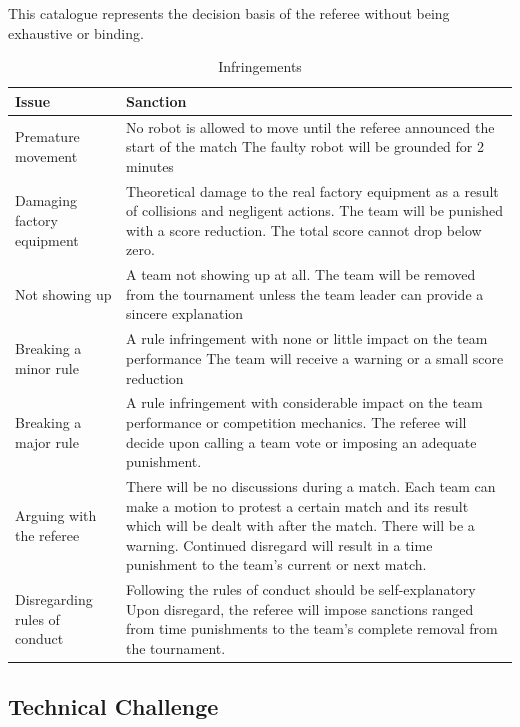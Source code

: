 \documentclass[12pt,twoside]{article}
\begin{document}
This catalogue represents the decision basis of the referee without
being exhaustive or binding.

\begin{table}[h!]
  \centering
  \begin{tabularx}{\linewidth}{l|X}
  \multicolumn{1}{l}{Issue} &\multicolumn{1}{l}{Sanction}\\\hline
  Premature movement & No robot is allowed to move until the referee
  announced the start of the match The faulty robot will be grounded
  for
  2 minutes\\[1ex]
%
  Damaging factory equipment & Theoretical damage to the real
  factory equipment as a result of collisions and negligent actions.
  The team will be punished with a score reduction. The total score
  cannot  drop below zero.\\[1ex]
%
  Not showing up & A team not showing up at all. The team will be
  removed from the tournament unless the team leader can provide a
  sincere explanation\\[1ex]
%
  Breaking a minor rule & A rule infringement with none or little
  impact on the team performance The team will receive a warning or a
  small  score reduction\\[1ex]
%
  Breaking a major rule & A rule infringement with considerable impact
  on the team performance or competition mechanics. The referee will
  decide upon calling a team vote or imposing an adequate punishment.\\[1ex]
%
  Arguing with the referee & There will be no discussions during a
  match. Each team can make a motion to protest a certain match and
  its result which will be dealt with after the match. There will be a
  warning. Continued disregard will result in a time punishment to the
  team's current or next match.\\[1ex]
%
  Disregarding rules of conduct & Following the rules of conduct
  should be self-explanatory Upon disregard, the referee will impose
  sanctions ranged from time punishments to the team's complete
  removal from the tournament.\\\hline
  \end{tabularx}  
  \caption{Infringements}
  \label{tab:infringements}
\end{table}



  \subsection{Technical Challenge}
  
\end{document}
